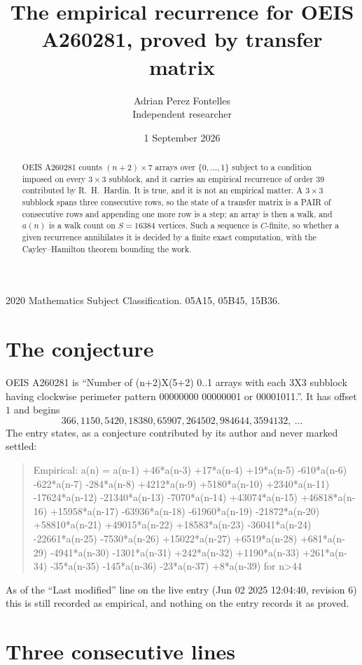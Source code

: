 \documentclass[11pt,a4paper]{article}
\title{The empirical recurrence for OEIS A260281, proved by transfer matrix}
\author{Adrian Perez Fontelles\\ \small Independent researcher}
\date{1 September 2026}
\theoremstyle{plain}
\theoremstyle{definition}
\begin{document}
\maketitle

\begin{abstract}
OEIS A260281 counts $(n+2)\times7$ arrays over $\{0,\dots,1\}$ subject to a condition imposed on
every $3\times3$ subblock, and it carries an empirical recurrence of order $39$
contributed by R.~H.~Hardin. It is true, and it is not an empirical matter. A $3\times3$
subblock spans three consecutive rows, so the state of a transfer matrix is a PAIR of
consecutive rows and appending one more row is a step; an array is then a walk, and
$a(n)$ is a walk count on $S=16384$ vertices. Such a sequence is $C$-finite, so whether a given
recurrence annihilates it is decided by a finite exact computation, with the Cayley--Hamilton
theorem bounding the work.
\end{abstract}

\noindent\small 2020 Mathematics Subject Classification. 05A15, 05B45, 15B36.\normalsize

\section{The conjecture}

OEIS A260281 is ``Number of (n+2)X(5+2) 0..1 arrays with each 3X3 subblock having clockwise perimeter pattern 00000000 00000001 or 00001011.''. It has offset $1$ and begins
\[
366, 1150, 5420, 18380, 65907, 264502, 984644, 3594132,\ \dots
\]
The entry states, as a conjecture contributed by its author and never marked settled:
\begin{quote}
Empirical: a(n) = a(n-1) +46*a(n-3) +17*a(n-4) +19*a(n-5) -610*a(n-6) -622*a(n-7) -284*a(n-8) +4212*a(n-9) +5180*a(n-10) +2340*a(n-11) -17624*a(n-12) -21340*a(n-13) -7070*a(n-14) +43074*a(n-15) +46818*a(n-16) +15958*a(n-17) -63936*a(n-18) -61960*a(n-19) -21872*a(n-20) +58810*a(n-21) +49015*a(n-22) +18583*a(n-23) -36041*a(n-24) -22661*a(n-25) -7530*a(n-26) +15022*a(n-27) +6519*a(n-28) +681*a(n-29) -4941*a(n-30) -1301*a(n-31) +242*a(n-32) +1190*a(n-33) +261*a(n-34) -35*a(n-35) -145*a(n-36) -23*a(n-37) +8*a(n-39) for n>44
\end{quote}
As of the ``Last modified'' line on the live entry (Jun 02 2025 12:04:40, revision 6) this is still
recorded as empirical, and nothing on the entry records it as proved.

\section{Three consecutive lines}
\end{document}
